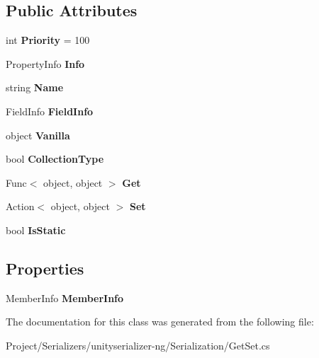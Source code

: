 \subsection*{Public Attributes}
\begin{DoxyCompactItemize}
\item 
\mbox{\label{class_serialization_1_1_get_set_acf288dfe024317153b0dffcfff8e9037}} 
int {\bfseries Priority} = 100
\item 
\mbox{\label{class_serialization_1_1_get_set_a9b7e80c6837875e9417311b3c03f19ae}} 
Property\+Info {\bfseries Info}
\item 
\mbox{\label{class_serialization_1_1_get_set_a02de1f60b640df55a90afb20b283cd7b}} 
string {\bfseries Name}
\item 
\mbox{\label{class_serialization_1_1_get_set_a1023fc00dbf0857c5a41dbad0b791a8c}} 
Field\+Info {\bfseries Field\+Info}
\item 
\mbox{\label{class_serialization_1_1_get_set_af3dfec3ec5796d5989c3ede3a43b062d}} 
object {\bfseries Vanilla}
\item 
\mbox{\label{class_serialization_1_1_get_set_ab18350c7fa05f210d1ca9906914792b9}} 
bool {\bfseries Collection\+Type}
\item 
\mbox{\label{class_serialization_1_1_get_set_aa0dc6c3a35eb728d92bad5de6de63f23}} 
Func$<$ object, object $>$ {\bfseries Get}
\item 
\mbox{\label{class_serialization_1_1_get_set_a964589b641d283db76e283b447790ef3}} 
Action$<$ object, object $>$ {\bfseries Set}
\item 
\mbox{\label{class_serialization_1_1_get_set_a55142e0807428a03ba49a0446b01151a}} 
bool {\bfseries Is\+Static}
\end{DoxyCompactItemize}
\subsection*{Properties}
\begin{DoxyCompactItemize}
\item 
\mbox{\label{class_serialization_1_1_get_set_a4a75edb3e7f3b72a0334cf9602adb2a5}} 
Member\+Info {\bfseries Member\+Info}
\end{DoxyCompactItemize}


The documentation for this class was generated from the following file\+:\begin{DoxyCompactItemize}
\item 
Project/\+Serializers/unityserializer-\/ng/\+Serialization/Get\+Set.\+cs\end{DoxyCompactItemize}
